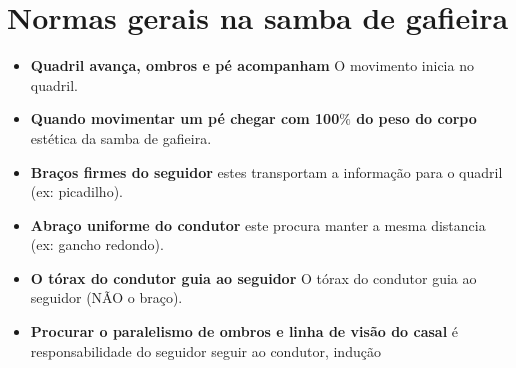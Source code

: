 \section{Normas gerais na samba de gafieira}


\begin{itemize}
\item \textbf{Quadril avança, ombros e pé acompanham}  O movimento inicia no quadril.
\item \textbf{Quando movimentar um pé chegar com 100$\%$ do peso do corpo} estética da samba de gafieira.
\item \textbf{Braços firmes do seguidor} estes transportam a informação para o quadril (ex: picadilho).
\item \textbf{Abraço uniforme do condutor} este procura manter a mesma distancia (ex: gancho redondo).
\item \textbf{O tórax do condutor guia ao seguidor} O tórax do condutor guia ao seguidor (NÃO o braço).
\item \textbf{Procurar o paralelismo de ombros e linha de visão do casal} é responsabilidade do seguidor seguir ao condutor, indução

\end{itemize}
